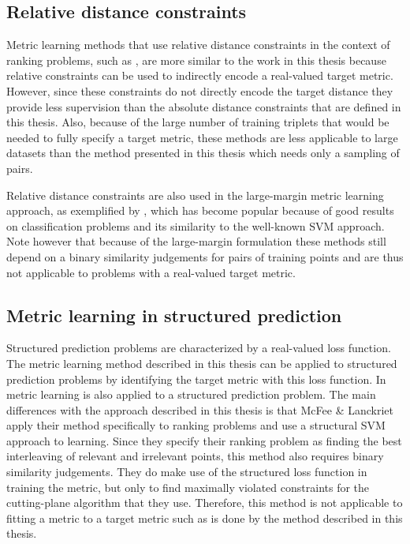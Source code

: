 \subsection{Relative distance constraints}

Metric learning methods that use relative distance constraints in the context of ranking problems, such as \cite{schultz2003learning}, are more similar to the work in this thesis because relative constraints can be used to indirectly encode a real-valued target metric. However, since these constraints do not directly encode the target distance they provide less supervision than the absolute distance constraints that are defined in this thesis. Also, because of the large number of training triplets that would be needed to fully specify a target metric, these methods are less applicable to large datasets than the method presented in this thesis which needs only a sampling of pairs.

Relative distance constraints are also used in the large-margin metric learning approach, as exemplified by \cite{weinberger2009distance, frome2007learning}, which has become popular because of good results on classification problems and its similarity to the well-known \ac{SVM} approach. Note however that because of the large-margin formulation these methods still depend on a binary similarity judgements for pairs of training points and are thus not applicable to problems with a real-valued target metric.


\subsection{Metric learning in structured prediction}

Structured prediction problems are characterized by a real-valued loss function. The metric learning method described in this thesis can be applied to structured prediction problems by identifying the target metric with this loss function. In\cite{mcfee2010metric} metric learning is also applied to a structured prediction problem. The main differences with the approach described in this thesis is that McFee \& Lanckriet apply their method specifically to ranking problems and use a structural \ac{SVM} approach to learning. Since they specify their ranking problem as finding the best interleaving of relevant and irrelevant points, this method also requires binary similarity judgements. They do make use of the structured loss function in training the metric, but only to find maximally violated constraints for the cutting-plane algorithm that they use. Therefore, this method is not applicable to fitting a metric to a target metric such as is done by the method described in this thesis.

